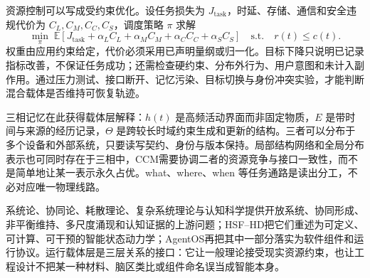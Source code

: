资源控制可以写成受约束优化。设任务损失为 $J_{\mathrm{task}}$，时延、存储、通信和安全违规代价为 $C_L,C_M,C_C,C_S$，调度策略 $\pi$ 求解
\[
\min_\pi\;\mathbb E[J_{\mathrm{task}}+\alpha_LC_L+\alpha_MC_M+\alpha_CC_C+\alpha_SC_S]
\quad\text{s.t.}\quad r(t)\le c(t).
\]
权重由应用约束给定，代价必须采用已声明量纲或归一化。目标下降只说明已记录指标改善，不保证任务成功；还需检查硬约束、分布外行为、用户意图和未计入副作用。通过压力测试、接口断开、记忆污染、目标切换与身份冲突实验，才能判断混合载体是否维持可恢复轨迹。

三相记忆在此获得载体层解释：$h(t)$ 是高频活动界面而非固定物质，$E$ 是带时间与来源的经历记录，$\Theta$ 是跨较长时域约束生成和更新的结构。三者可以分布于多个设备和外部系统，只要读写契约、身份与版本保持。局部结构网络和全局分布表示也可同时存在于三相中，CCM需要协调二者的资源竞争与接口一致性，而不是简单地让某一表示永久占优。what、where、when 等任务通路是读出分工，不必对应唯一物理线路。

系统论、协同论、耗散理论、复杂系统理论与认知科学提供开放系统、协同形成、非平衡维持、多尺度涌现和认知证据的上游问题；HSF--HD把它们重述为可定义、可计算、可干预的智能状态动力学；AgentOS再把其中一部分落实为软件组件和运行协议。运行载体层是三层关系的接口：它让一般理论接受现实资源约束，也让工程设计不把某一种材料、脑区类比或组件命名误当成智能本身。
